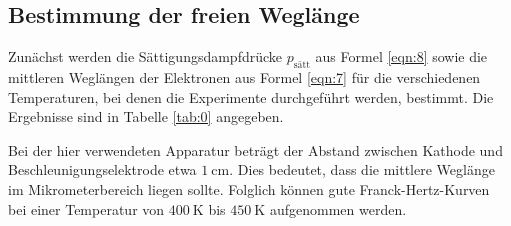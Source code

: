 
\subsection{Bestimmung der freien Weglänge}
Zunächst werden die Sättigungsdampfdrücke $p_{\text{sätt}}$ aus Formel \eqref{eqn:8} sowie die mittleren Weglängen der Elektronen aus Formel \eqref{eqn:7} für die verschiedenen Temperaturen, bei denen die Experimente durchgeführt werden, bestimmt.
Die Ergebnisse sind in Tabelle \ref{tab:0} angegeben.

Bei der hier verwendeten Apparatur beträgt der Abstand zwischen Kathode und Beschleunigungselektrode etwa $\SI{1}{\centi\metre}$.
Dies bedeutet, dass die mittlere Weglänge im Mikrometerbereich liegen sollte.
Folglich können gute Franck-Hertz-Kurven bei einer Temperatur von $\SI{400}{\kelvin}$ bis $\SI{450}{\kelvin}$ aufgenommen werden.

